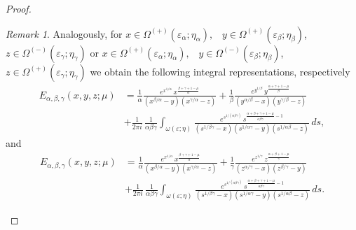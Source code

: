 \documentclass[12pt, reqno]{amsart}
\theoremstyle{definition}
\theoremstyle{remark}
\newtheorem{remark}[theorem]{Remark}
\numberwithin{equation}{section}
\begin{document}
\begin{proof}
\begin{remark} Analogously, for  $x\in\Omega^{(+)}(\varepsilon_{\alpha};\eta_\alpha),$
\,
$y\in\Omega^{(+)}(\varepsilon_{\beta};\eta_\beta)$,\, $z\in\Omega^{(-)}(\varepsilon_{\gamma};\eta_\gamma)$ or $x\in\Omega^{(+)}(\varepsilon_{\alpha};\eta_\alpha),$
\,
$y\in\Omega^{(-)}(\varepsilon_{\beta};\eta_\beta)$,\, $z\in\Omega^{(+)}(\varepsilon_{\gamma};\eta_\gamma)$
we obtain the following integral representations, respectively 
$$\begin{aligned}
E_{\alpha,\beta,\gamma}(x,y,z;\mu)
&=\frac{1}{\alpha}\frac{
e^{x^{1/\alpha}}
\,x^{\frac{\beta+\gamma+1-\mu}{\alpha}}}
{(x^{\beta/\alpha}-y)(x^{\gamma/\alpha}-z)}+\frac{1}{\beta}\frac{
e^{y^{1/\beta}}
\,y^{\frac{\alpha+\gamma+1-\mu}{\beta}}}
{(y^{\alpha/\beta}-x)(y^{\gamma/\beta}-z)}\\
&+
\frac{1}{2\pi i}\,
\frac{1}{\alpha\beta\gamma}
\int_{\omega(\varepsilon;\eta)}
\frac{
e^{s^{1/(\alpha\beta\gamma)}}
\,s^{\frac{\alpha+\beta+\gamma+1-\mu}{\alpha\beta\gamma}-1}
}
{
(s^{1/\beta\gamma}-x)(s^{1/\alpha\gamma}-y)(s^{1/\alpha\beta}-z)
}
\,ds,\end{aligned}
$$
and 
$$\begin{aligned}
E_{\alpha,\beta,\gamma}(x,y,z;\mu)
&=\frac{1}{\alpha}\frac{
e^{x^{1/\alpha}}
\,x^{\frac{\beta+\gamma+1-\mu}{\alpha}}}
{(x^{\beta/\alpha}-y)(x^{\gamma/\alpha}-z)}+\frac{1}{\gamma}\frac{
e^{z^{1/\gamma}}
\,z^{\frac{\alpha+\beta+1-\mu}{\gamma}}}
{(z^{\alpha/\gamma}-x)(z^{\beta/\gamma}-y)}\\
&+
\frac{1}{2\pi i}\,
\frac{1}{\alpha\beta\gamma}
\int_{\omega(\varepsilon;\eta)}
\frac{
e^{s^{1/(\alpha\beta\gamma)}}
\,s^{\frac{\alpha+\beta+\gamma+1-\mu}{\alpha\beta\gamma}-1}
}
{
(s^{1/\beta\gamma}-x)(s^{1/\alpha\gamma}-y)(s^{1/\alpha\beta}-z)
}
\,ds.\end{aligned}
$$\end{remark}


\end{proof}
\end{document}
